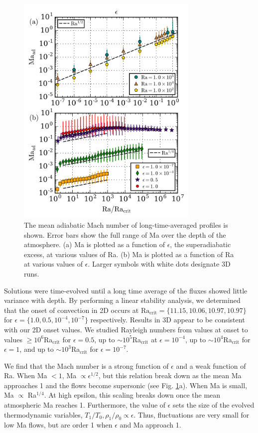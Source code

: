 \documentclass[aps, prl, twocolumn, nofootinbib, groupedaddress, amsfonts, amssymb, amsmath]{revtex4-1}
\begin{document}
\begin{figure}[t]
\includegraphics[width=3.4375in]{./figs/ma_v_Ra.png}
\caption{The mean adiabatic Mach number of long-time-averaged profiles
is shown.  Error bars show the full range of Ma over the depth of the
atmosphere.
(a) Ma is plotted as a function of $\epsilon$, the superadiabatic excess,
at various values of Ra.
(b) Ma is plotted as a function of Ra at various values of $\epsilon$.
Larger symbols with white dots designate 3D runs.
\label{fig:ma_v_eps} }
\end{figure}


Solutions were time-evolved until a long time average of the fluxes
showed little
variance with depth. By performing a linear stability analysis, 
we determined that the onset of convection in 2D
occurs at $\text{Ra}_{\text{crit}} = \{11.15, 10.06, 10.97, 10.97\}$ 
for $\epsilon = \{1.0, 0.5, 10^{-4}, 10^{-7}\}$ respectively.  Results
in 3D appear to be consistent with our 2D onset values.
We studied Rayleigh
numbers from values at onset to values $\geq 10^6$Ra$_{\text{crit}}$ 
for $\epsilon = 0.5$, up to
$\sim 10^5$Ra$_{\text{crit}}$ at $\epsilon = 10^{-4}$, 
up to $\sim 10^4$Ra$_{\text{crit}}$ for $\epsilon = 1$,
and up to $\sim 10^3$Ra$_{\text{crit}}$ for $\epsilon = 10^{-7}$.

We find that the Mach number is a strong function of 
$\epsilon$ and a weak function of Ra.  
When Ma $< 1$, Ma $\propto \epsilon^{1/2}$, 
but this relation break down as the mean
Ma approaches 1 and the flows become supersonic (see Fig. \ref{fig:ma_v_eps}a).  
When Ma is small,
Ma $\propto$ Ra$^{1/4}$.  At high epsilon, 
this scaling breaks down once the mean atmospheric Ma reaches 1.
Furthermore, the value of $\epsilon$ sets the size of the
evolved thermodynamic variables, 
$T_1/T_0, \rho_1/\rho_0 \propto \epsilon$.  Thus, fluctuations
are very small for low Ma flows, 
but are order 1 when $\epsilon$ and Ma approach 1.
\end{document}
